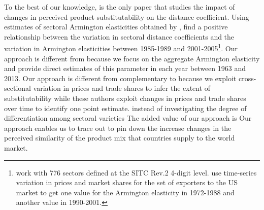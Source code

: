 \documentclass[12pt,twoside,a4paper,notitlepage]{article}
\begin{document}
To the best of our knowledge, \cite{Berthelon2008} is the only paper that studies the impact of changes in perceived product substitutability on the distance coefficient.
Using estimates of sectoral Armington elasticities obtained by \cite{Broda2006}, \cite{Berthelon2008} find a positive relationship between the variation in sectoral distance coefficients and the variation in Armington elasticities between 1985-1989 and 2001-2005\footnote{\cite{Berthelon2008} work with 776 sectors defined at the SITC Rev.2 4-digit level.
\cite{Broda2006} use time-series variation in prices and market shares for the set of exporters to the US market to get one value for the Armington elasticity in 1972-1988 and another value in 1990-2001.}.
Our approach is different from \cite{Berthelon2008} because we focus on the aggregate Armington elasticity and provide direct estimates of this parameter in each year between 1963 and 2013.
Our approach is different from  complementary to\fi \cite{Broda2006} because we exploit cross-sectional variation in prices and trade shares to infer the extent of substitutability while these authors exploit changes in prices and trade shares over time to identify one point estimate.
 instead of investigating the degree of differentiation among sectoral varieties The added value of our approach is \fi Our approach enables us to trace out  to pin down the increase \fi changes in the perceived similarity of the product mix that countries supply to the world market.
\end{document}
